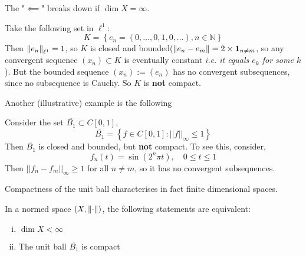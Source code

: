 \documentclass{article}
\begin{document}
The "$\impliedby$" breaks down if $\dim X = \infty$.

\begin{example}
    Take the following set in $\ell^1$:  
    \begin{equation*}
        K = \left\{ e_n = (0, \ldots, 0, 1, 0, \ldots), n \in \mathbb{N} \right\}
    \end{equation*}  
    Then $\left\|{e_n}\right\|_{\ell^1}=1$, so $K$ is closed and bounded($\left\|{e_n-e_m}\right\| = 2 \times \mathbf{1}_{n\neq m}$, so any convergent sequence $(x_n) \subset K$ is eventually constant \textit{i.e. it equals $e_k$ for some $k$}). But the bounded sequence $(x_n) := (e_n)$ has no convergent subsequences, since no subsequence is Cauchy. So $K$ is \textbf{not} compact.
\end{example}  

Another (illustrative) example is the following  

\begin{example}
    Consider the set $\overline{B_1} \subset C[0,1]$,  
    \begin{equation*}
        \overline{B_1} = \left\{ f \in C[0,1] : ||f||_{\infty} \leq 1 \right\}
    \end{equation*}  
    Then $\overline{B_1}$ is closed and bounded, but \textbf{not} compact. To see this,
    consider,  
    \begin{equation*}
        f_n(t) = \sin(2^n \pi t), \quad 0 \leq t \leq 1
    \end{equation*}  
    Then $||f_n-f_m||_{\infty}\geq 1$ for all $n \neq m$, so it has no convergent subsequences. 
\end{example}

Compactness of the unit ball characterises in fact finite dimensional spaces.  

\begin{theorem}\nextline
    In a normed space $(X, \left\|{\cdot}\right\|)$, the following statements are equivalent:  
    \begin{enumerate}[i)]
        \item $\dim X < \infty$
        \item The unit ball $\overline{B_1}$ is compact 
    \end{enumerate}
\end{theorem}  
\end{document}
